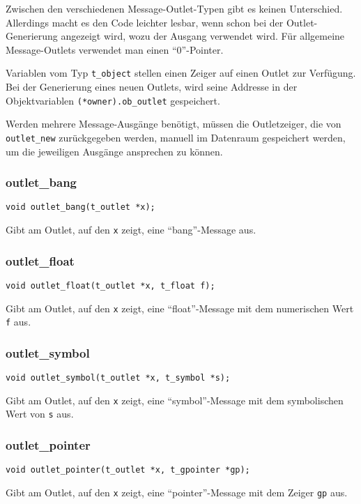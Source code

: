 \documentclass[12pt, a4paper,austrian, titlepage]{article}
\begin{document}
\begin{appendix}
Zwischen den verschiedenen Message-Outlet-Typen gibt es keinen Unterschied.
Allerdings macht es den Code leichter lesbar,
wenn schon bei der Outlet-Generierung angezeigt wird, wozu der Ausgang verwendet wird.
Für allgemeine Message-Outlets verwendet man einen ``0''-Pointer.

Variablen vom Typ \verb+t_object+ stellen einen Zeiger auf einen Outlet zur Verfügung.
Bei der Generierung eines neuen Outlets,
wird seine Addresse in der Objektvariablen \verb+(*owner).ob_outlet+ gespeichert.

Werden mehrere Message-Ausgänge benötigt, müssen die Outletzeiger,
die von \verb+outlet_new+ zurückgegeben werden, manuell im Datenraum gespeichert werden,
um die jeweiligen Ausgänge ansprechen zu können.

\subsubsection{outlet\_bang}
\begin{verbatim}
void outlet_bang(t_outlet *x);
\end{verbatim}
Gibt am Outlet, auf den \verb+x+ zeigt, eine ``bang''-Message aus.

\subsubsection{outlet\_float}
\begin{verbatim}
void outlet_float(t_outlet *x, t_float f);
\end{verbatim}
Gibt am Outlet, auf den \verb+x+ zeigt, eine ``float''-Message mit dem 
numerischen Wert \verb+f+ aus.

\subsubsection{outlet\_symbol}
\begin{verbatim}
void outlet_symbol(t_outlet *x, t_symbol *s);
\end{verbatim}
Gibt am Outlet, auf den \verb+x+ zeigt, eine ``symbol''-Message mit dem 
symbolischen Wert von \verb+s+ aus.

\subsubsection{outlet\_pointer}
\begin{verbatim}
void outlet_pointer(t_outlet *x, t_gpointer *gp);
\end{verbatim}
Gibt am Outlet, auf den \verb+x+ zeigt, eine ``pointer''-Message mit dem 
Zeiger \verb+gp+ aus.


\end{appendix}
\end{document}
